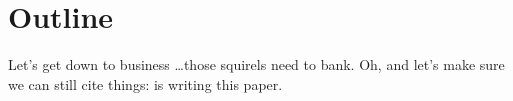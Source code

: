 \section{Outline}
Let's get down to business \ldots those squirels need to bank. Oh,
and let's make sure we can still cite things: \cite{rozon96} is writing this
paper.

